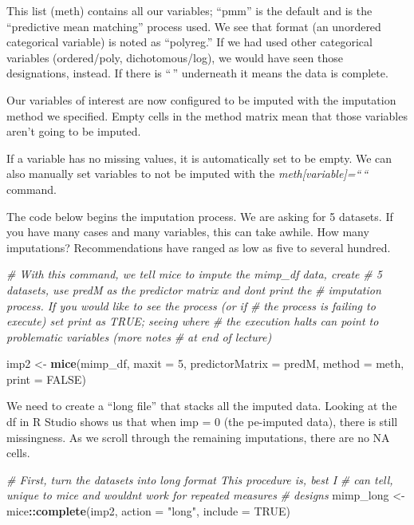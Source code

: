 \documentclass[
  11pt,
]{book}
\newenvironment{Shaded}{\begin{snugshade}}{\end{snugshade}}
\newcommand{\AttributeTok}[1]{\textcolor[rgb]{0.27,0.27,0.27}{#1}}
\newcommand{\CommentTok}[1]{\textcolor[rgb]{0.37,0.37,0.37}{\textit{#1}}}
\newcommand{\ConstantTok}[1]{\textcolor[rgb]{0.37,0.37,0.37}{#1}}
\newcommand{\DecValTok}[1]{\textcolor[rgb]{0.06,0.06,0.06}{#1}}
\newcommand{\FunctionTok}[1]{\textcolor[rgb]{0.27,0.27,0.27}{\textbf{#1}}}
\newcommand{\NormalTok}[1]{#1}
\newcommand{\OtherTok}[1]{\textcolor[rgb]{0.37,0.37,0.37}{#1}}
\newcommand{\SpecialCharTok}[1]{\textcolor[rgb]{0.43,0.43,0.43}{\textbf{#1}}}
\newcommand{\StringTok}[1]{\textcolor[rgb]{0.5,0.5,0.5}{#1}}
\begin{document}
This list (meth) contains all our variables; ``pmm'' is the default and is the ``predictive mean matching'' process used. We see that format (an unordered categorical variable) is noted as ``polyreg.'' If we had used other categorical variables (ordered/poly, dichotomous/log), we would have seen those designations, instead. If there is ``\,'' underneath it means the data is complete.

Our variables of interest are now configured to be imputed with the imputation method we specified. Empty cells in the method matrix mean that those variables aren't going to be imputed.

If a variable has no missing values, it is automatically set to be empty. We can also manually set variables to not be imputed with the \emph{meth{[}variable{]}=``\,``} command.

The code below begins the imputation process. We are asking for 5 datasets. If you have many cases and many variables, this can take awhile. How many imputations? Recommendations have ranged as low as five to several hundred.

\begin{Shaded}
\begin{Highlighting}[]
\CommentTok{\# With this command, we tell mice to impute the mimp\_df data, create}
\CommentTok{\# 5 datasets, use predM as the predictor matrix and don\textquotesingle{}t print the}
\CommentTok{\# imputation process.  If you would like to see the process (or if}
\CommentTok{\# the process is failing to execute) set print as TRUE; seeing where}
\CommentTok{\# the execution halts can point to problematic variables (more notes}
\CommentTok{\# at end of lecture)}

\NormalTok{imp2 }\OtherTok{\textless{}{-}} \FunctionTok{mice}\NormalTok{(mimp\_df, }\AttributeTok{maxit =} \DecValTok{5}\NormalTok{, }\AttributeTok{predictorMatrix =}\NormalTok{ predM, }\AttributeTok{method =}\NormalTok{ meth,}
    \AttributeTok{print =} \ConstantTok{FALSE}\NormalTok{)}
\end{Highlighting}
\end{Shaded}

We need to create a ``long file'' that stacks all the imputed data. Looking at the df in R Studio shows us that when imp = 0 (the pe-imputed data), there is still missingness. As we scroll through the remaining imputations, there are no NA cells.

\begin{Shaded}
\begin{Highlighting}[]
\CommentTok{\# First, turn the datasets into long format This procedure is, best I}
\CommentTok{\# can tell, unique to mice and wouldn\textquotesingle{}t work for repeated measures}
\CommentTok{\# designs}
\NormalTok{mimp\_long }\OtherTok{\textless{}{-}}\NormalTok{ mice}\SpecialCharTok{::}\FunctionTok{complete}\NormalTok{(imp2, }\AttributeTok{action =} \StringTok{"long"}\NormalTok{, }\AttributeTok{include =} \ConstantTok{TRUE}\NormalTok{)}
\end{Highlighting}
\end{Shaded}
\end{document}
